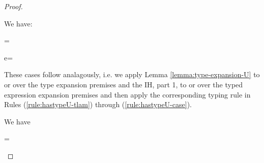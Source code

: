 \begin{proof}
\begin{byCases}
\item[\text{(\ref{rule:expandsU-ap})}] We have:
\begin{pfsteps}
  \item \ue= 
  \item e= 
  \item {} 
  \item {} 
  \item {} 
  \item {} 
  \item {} 
\end{pfsteps}
\resetpfcounter

\item[\text{(\ref{rule:expandsU-tlam})}~\text{through}~\text{(\ref{rule:expandsU-case})}] These cases follow analagously, i.e. we apply Lemma \ref{lemma:type-expansion-U} to or over the type expansion premises and the IH, part 1, to or over the typed expression expansion premises and then apply the corresponding typing rule in Rules (\ref{rule:hastypeU-tlam}) through (\ref{rule:hastypeU-case}).
\\

\item[\text{(\ref{rule:expandsU-syntax})}] We have 
\begin{pfsteps}
  \item \ue= 
  \item {}  
  \item {} 
  \item {} 
\end{pfsteps}
\resetpfcounter 


\end{byCases}
\end{proof}
